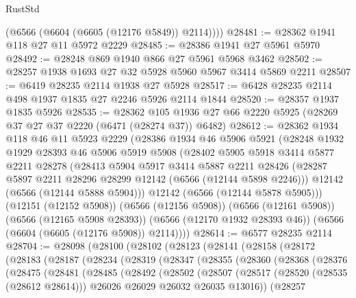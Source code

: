 \begin{lexlean}{RustStd}
\begin{coremodule}
        (@6566 (@6604 (@6605 (@12176 @5849)) @2114))))
@28481 := @28362 @1941 @118 @27 @11 @5972 @2229
@28485 := @28386 @1941 @27 @5961 @5970
@28492 := @28248 @869 @1940 @866 @27 @5961 @5968 @3462
@28502 := @28257 @1938 @1693 @27 @32 @5928 @5960 @5967 @3414 @5869 @2211
@28507 := @6419 @28235 @2114 @1938 @27 @5928
@28517 := @6428 @28235 @2114 @498 @1937 @1835 @27 @2246 @5926 @2114 @1844
@28520 := @28357 @1937 @1835 @5926
@28535 := @28362
    @105
    @1936
    @27
    @66
    @2220
    @5925
    (@28269 @37 @27 @37 @2220 (@6471 (@28274 @37)) @6482)
@28612 := @28362
    @1934
    @118
    @46
    @11
    @5923
    @2229
    (@28386
      @1934
      @46
      @5906
      @5921
      (@28248
        @1932
        @1929
        @28393
        @46
        @5906
        @5919
        @5908
        (@28402
          @5905
          @5918
          @3414
          @5877
          @2211
          @28278
          (@28413
            @5904
            @5917
            @3414
            @5887
            @2211
            @28426
            (@28287 @5897 @2211 @28296 @28299 @12142 (@6566 (@12144 @5898 @2246)))
            @12142
            (@6566 (@12144 @5888 @5904)))
          @12142
          (@6566 (@12144 @5878 @5905)))
        (@12151 (@12152 @5908))
        (@6566 (@12156 @5908))
        (@6566 (@12161 @5908))
        (@6566 (@12165 @5908 @28393))
        (@6566 (@12170 @1932 @28393 @46))
        (@6566 (@6604 (@6605 (@12176 @5908)) @2114))))
@28614 := @6577 @28235 @2114
@28704 := @28098
    (@28100
      (@28102
        (@28123
          (@28141
            (@28158
              (@28172
                (@28183
                  (@28187
                    (@28234
                      (@28319
                        (@28347
                          (@28355
                            (@28360
                              (@28368
                                (@28376
                                  (@28475
                                    (@28481
                                      (@28485
                                        (@28492
                                          (@28502
                                            (@28507
                                              (@28517
                                                (@28520 (@28535 (@28612 @28614)))
                                                @26026
                                                @26029
                                                @26032
                                                @26035
                                                @13016))
                                            (@28257

\end{coremodule}
\end{lexlean}
